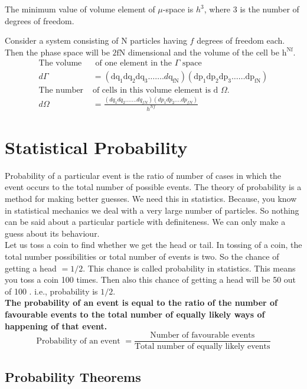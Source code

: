 The minimum value of volume element of $\mu$-space is $h^{3}$, where 3 is the number of degrees of freedom.\\
\par Consider a system consisting of $\mathrm{N}$ particles having $f$ degrees of freedom each. Then the phase space will be $2 \mathrm{fN}$ dimensional and the volume of the cell be $\mathrm{h}^{\mathrm{Nf}}$.
\begin{align*}
\text{The volume}&\text{ of one element in the $\Gamma$ space}\\
d\Gamma&=\left(\mathrm{dq}_{1} \mathrm{dq}_{2} \mathrm{dq}_{3} \ldots \ldots . d \mathrm{q}_{\mathrm{fN}}\right)\left(\mathrm{dp}_{1} \mathrm{dp}_{2} \mathrm{dp}_{3} \ldots \ldots \mathrm{dp}_{\mathrm{fN}}\right)\\
\text{The number }&\text{of cells in this volume element is d $\Omega$.}
\\
d \Omega&=\frac{\left(d q_{1} d q_{2} \ldots \ldots . d q_{f N}\right)\left(d p_{1} d p_{2} \ldots . d p_{f N}\right)}{h^{N f}}
\end{align*}
\section{Statistical Probability}
Probability of a particular event is the ratio of number of cases in which the event occurs to the total number of possible events. The theory of probability is a method for making better guesses. We need this in statistics. Because, you know in statistical mechanics we deal with a very large number of particles. So nothing can be said about a particular particle with definiteness. We can only make a guess about its behaviour.\\
Let us toss a coin to find whether we get the head or tail. In tossing of a coin, the total number possibilities or total number of events is two. So the chance of getting a head $=1 / 2$. This chance is called probability in statistics. This means you toss a coin 100 times. Then also this chance of getting a head will be 50 out of 100 . i.e., probability is $1 / 2$.\\
\textbf{The probability of an event is equal to the ratio of the number of favourable events to the total number of equally likely ways of happening of that event.}\\
$$\text{Probability of an event }=\frac{\text{Number of favourable events}}{\text{Total number of equally likely events}}$$
\subsection{Probability Theorems}

